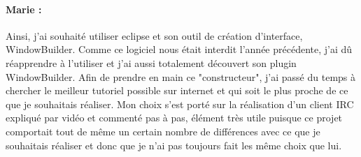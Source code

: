 \paragraph{Marie : }Ainsi, j'ai souhaité utiliser eclipse et son outil de création d'interface, WindowBuilder. Comme ce logiciel nous était interdit l'année précédente, j'ai dû réapprendre à l'utiliser et j'ai aussi totalement découvert son plugin WindowBuilder. Afin de prendre en main ce "constructeur", j'ai passé du temps à chercher le meilleur tutoriel possible sur internet et qui soit le plus proche de ce que je souhaitais réaliser. Mon choix s'est porté sur la réalisation d'un client IRC expliqué par vidéo et commenté pas à pas, élément très utile puisque ce projet comportait tout de même un certain nombre de différences avec ce que je souhaitais réaliser et donc que je n'ai pas toujours fait les même choix que lui. 

